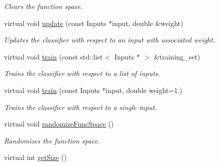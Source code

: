 \begin{DoxyCompactItemize}
\begin{DoxyCompactList}\small\item\em Clears the function space. \end{DoxyCompactList}\item 
virtual void \hyperlink{classiCub_1_1boostMIL_1_1OnlineBoost_a4309a08bf487eaaf911a1977deed8086}{update} (const Inputs $\ast$input, double \&weight)
\begin{DoxyCompactList}\small\item\em Updates the classifier with respect to an input with associated weight. \end{DoxyCompactList}\item 
virtual void \hyperlink{classiCub_1_1boostMIL_1_1OnlineBoost_ac041211afdfcdb4212c01e1bbcfe8ad9}{train} (const std\+::list$<$ Inputs $\ast$ $>$ \&training\+\_\+set)
\begin{DoxyCompactList}\small\item\em Trains the classifier with respect to a list of inputs. \end{DoxyCompactList}\item 
virtual void \hyperlink{classiCub_1_1boostMIL_1_1OnlineBoost_a70417657e5af5c133a824be77cdc7725}{train} (const Inputs $\ast$input, double weight=1.)
\begin{DoxyCompactList}\small\item\em Trains the classifier with respect to a single input. \end{DoxyCompactList}\item 
virtual void \hyperlink{classiCub_1_1boostMIL_1_1OnlineBoost_aab39922f8637b15d5cfbfb8aaf3cf239}{randomize\+Func\+Space} ()
\begin{DoxyCompactList}\small\item\em Randomizes the function space. \end{DoxyCompactList}\item 
virtual int \hyperlink{classiCub_1_1boostMIL_1_1StrongClassifier_a99285415c37a3f1271c8afb2b5e3ae94}{get\+Size} ()\label{classiCub_1_1boostMIL_1_1StrongClassifier_a99285415c37a3f1271c8afb2b5e3ae94}


\end{DoxyCompactItemize}
